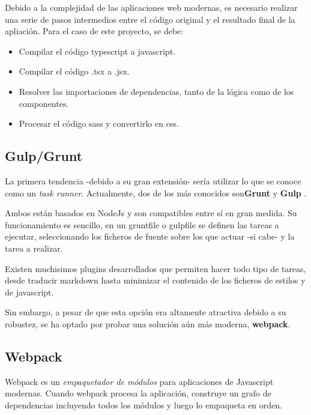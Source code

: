 Debido a la complejidad de las aplicaciones web modernas, es necesario 
realizar una serie de pasos intermedios entre el código original y 
el resultado final de la apliación. Para el caso de este proyecto, se debe:

\begin{itemize}

\item Compilar el código typescript a javascript.

\item Compilar el código .tsx a .jsx.

\item Resolver las importaciones de dependencias, tanto de la lógica
como de los componentes.

\item Procesar el código sass y convertirlo en css.

\end{itemize}

\subsection{Gulp/Grunt}

La primera tendencia -debido a su gran extensión- sería utilizar 
lo que se conoce como un \textit{task runner}. Actualmente, dos de los 
más conocidos son\textbf{Grunt} \cite{grunt} y  \textbf{Gulp} \cite{gulp}.

\bigskip
Ambos están basados en NodeJs y son compatibles entre sí en gran medida.
Su funcionamiento es sencillo, en un gruntfile o gulpfile se definen las tareas a
ejecutar, seleccionando los ficheros de fuente sobre los que actuar -si cabe- y la tarea 
a realizar.

\bigskip
Existen muchisimos plugins desarrollados que permiten hacer todo tipo de tareas, desde traducir
markdown hasta minimizar el contenido de los ficheros de estilos y de javascript.

\bigskip
Sin embargo, a pesar de que esta opción era altamente atractiva debido 
a su robustez, se ha optado por probar una solución aún más moderna, \textbf{webpack}.

\subsection{Webpack}

Webpack es un \textit{empaquetador de módulos} para aplicaciones de Javascript modernas.
Cuando webpack procesa la aplicación, construye un grafo de dependencias
incluyendo todos los módulos y luego lo empaqueta en orden. \cite{webpack} 

